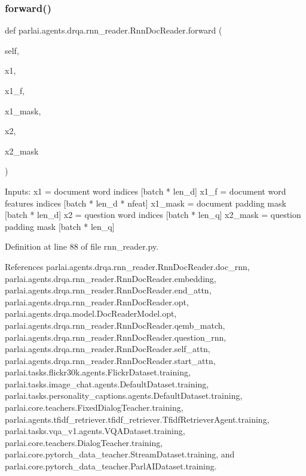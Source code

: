 \subsubsection{\texorpdfstring{forward()}{forward()}}
{\footnotesize\ttfamily def parlai.\+agents.\+drqa.\+rnn\+\_\+reader.\+Rnn\+Doc\+Reader.\+forward (\begin{DoxyParamCaption}\item[{}]{self,  }\item[{}]{x1,  }\item[{}]{x1\+\_\+f,  }\item[{}]{x1\+\_\+mask,  }\item[{}]{x2,  }\item[{}]{x2\+\_\+mask }\end{DoxyParamCaption})}

\begin{DoxyVerb}Inputs:
x1 = document word indices             [batch * len_d]
x1_f = document word features indices  [batch * len_d * nfeat]
x1_mask = document padding mask        [batch * len_d]
x2 = question word indices             [batch * len_q]
x2_mask = question padding mask        [batch * len_q]
\end{DoxyVerb}
 

Definition at line 88 of file rnn\+\_\+reader.\+py.



References parlai.\+agents.\+drqa.\+rnn\+\_\+reader.\+Rnn\+Doc\+Reader.\+doc\+\_\+rnn, parlai.\+agents.\+drqa.\+rnn\+\_\+reader.\+Rnn\+Doc\+Reader.\+embedding, parlai.\+agents.\+drqa.\+rnn\+\_\+reader.\+Rnn\+Doc\+Reader.\+end\+\_\+attn, parlai.\+agents.\+drqa.\+rnn\+\_\+reader.\+Rnn\+Doc\+Reader.\+opt, parlai.\+agents.\+drqa.\+model.\+Doc\+Reader\+Model.\+opt, parlai.\+agents.\+drqa.\+rnn\+\_\+reader.\+Rnn\+Doc\+Reader.\+qemb\+\_\+match, parlai.\+agents.\+drqa.\+rnn\+\_\+reader.\+Rnn\+Doc\+Reader.\+question\+\_\+rnn, parlai.\+agents.\+drqa.\+rnn\+\_\+reader.\+Rnn\+Doc\+Reader.\+self\+\_\+attn, parlai.\+agents.\+drqa.\+rnn\+\_\+reader.\+Rnn\+Doc\+Reader.\+start\+\_\+attn, parlai.\+tasks.\+flickr30k.\+agents.\+Flickr\+Dataset.\+training, parlai.\+tasks.\+image\+\_\+chat.\+agents.\+Default\+Dataset.\+training, parlai.\+tasks.\+personality\+\_\+captions.\+agents.\+Default\+Dataset.\+training, parlai.\+core.\+teachers.\+Fixed\+Dialog\+Teacher.\+training, parlai.\+agents.\+tfidf\+\_\+retriever.\+tfidf\+\_\+retriever.\+Tfidf\+Retriever\+Agent.\+training, parlai.\+tasks.\+vqa\+\_\+v1.\+agents.\+V\+Q\+A\+Dataset.\+training, parlai.\+core.\+teachers.\+Dialog\+Teacher.\+training, parlai.\+core.\+pytorch\+\_\+data\+\_\+teacher.\+Stream\+Dataset.\+training, and parlai.\+core.\+pytorch\+\_\+data\+\_\+teacher.\+Parl\+A\+I\+Dataset.\+training.




